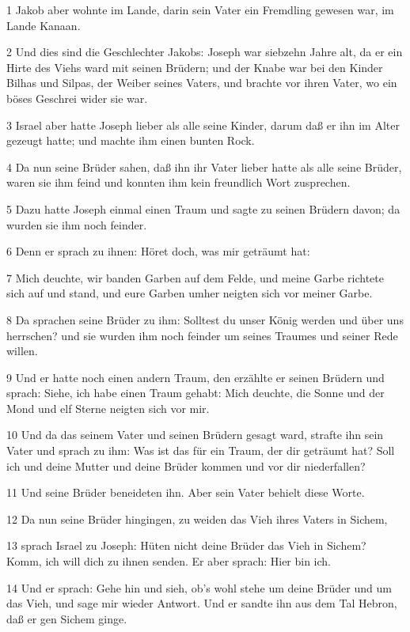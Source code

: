 \par 1 Jakob aber wohnte im Lande, darin sein Vater ein Fremdling gewesen war, im Lande Kanaan.
\par 2 Und dies sind die Geschlechter Jakobs: Joseph war siebzehn Jahre alt, da er ein Hirte des Viehs ward mit seinen Brüdern; und der Knabe war bei den Kinder Bilhas und Silpas, der Weiber seines Vaters, und brachte vor ihren Vater, wo ein böses Geschrei wider sie war.
\par 3 Israel aber hatte Joseph lieber als alle seine Kinder, darum daß er ihn im Alter gezeugt hatte; und machte ihm einen bunten Rock.
\par 4 Da nun seine Brüder sahen, daß ihn ihr Vater lieber hatte als alle seine Brüder, waren sie ihm feind und konnten ihm kein freundlich Wort zusprechen.
\par 5 Dazu hatte Joseph einmal einen Traum und sagte zu seinen Brüdern davon; da wurden sie ihm noch feinder.
\par 6 Denn er sprach zu ihnen: Höret doch, was mir geträumt hat:
\par 7 Mich deuchte, wir banden Garben auf dem Felde, und meine Garbe richtete sich auf und stand, und eure Garben umher neigten sich vor meiner Garbe.
\par 8 Da sprachen seine Brüder zu ihm: Solltest du unser König werden und über uns herrschen? und sie wurden ihm noch feinder um seines Traumes und seiner Rede willen.
\par 9 Und er hatte noch einen andern Traum, den erzählte er seinen Brüdern und sprach: Siehe, ich habe einen Traum gehabt: Mich deuchte, die Sonne und der Mond und elf Sterne neigten sich vor mir.
\par 10 Und da das seinem Vater und seinen Brüdern gesagt ward, strafte ihn sein Vater und sprach zu ihm: Was ist das für ein Traum, der dir geträumt hat? Soll ich und deine Mutter und deine Brüder kommen und vor dir niederfallen?
\par 11 Und seine Brüder beneideten ihn. Aber sein Vater behielt diese Worte.
\par 12 Da nun seine Brüder hingingen, zu weiden das Vieh ihres Vaters in Sichem,
\par 13 sprach Israel zu Joseph: Hüten nicht deine Brüder das Vieh in Sichem? Komm, ich will dich zu ihnen senden. Er aber sprach: Hier bin ich.
\par 14 Und er sprach: Gehe hin und sieh, ob's wohl stehe um deine Brüder und um das Vieh, und sage mir wieder Antwort. Und er sandte ihn aus dem Tal Hebron, daß er gen Sichem ginge.
